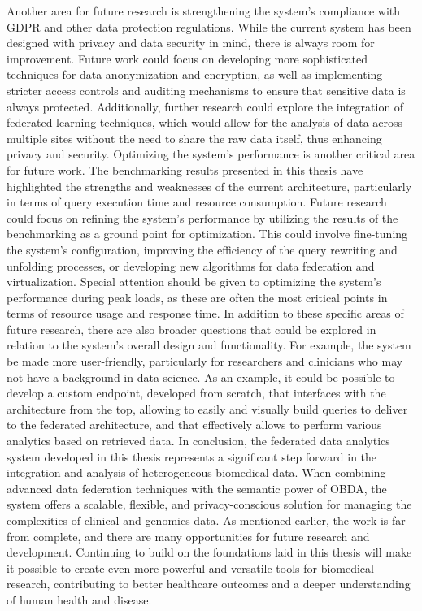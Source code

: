 Another area for future research is strengthening the system's compliance with \ac{GDPR} and other data protection regulations. While the current system has been designed with privacy and data security in mind, there is always room for improvement. Future work could focus on developing more sophisticated techniques for data anonymization and encryption, as well as implementing stricter access controls and auditing mechanisms to ensure that sensitive data is always protected. Additionally, further research could explore the integration of federated learning techniques, which would allow for the analysis of data across multiple sites without the need to share the raw data itself, thus enhancing privacy and security.
Optimizing the system's performance is another critical area for future work. The benchmarking results presented in this thesis have highlighted the strengths and weaknesses of the current architecture, particularly in terms of query execution time and resource consumption. Future research could focus on refining the system's performance by utilizing the results of the benchmarking as a ground point for optimization. This could involve fine-tuning the system's configuration, improving the efficiency of the query rewriting and unfolding processes, or developing new algorithms for data federation and virtualization. Special attention should be given to optimizing the system's performance during peak loads, as these are often the most critical points in terms of resource usage and response time.
In addition to these specific areas of future research, there are also broader questions that could be explored in relation to the system's overall design and functionality. For example, the system be made more user-friendly, particularly for researchers and clinicians who may not have a background in data science. As an example, it could be possible to develop a custom endpoint, developed from scratch, that interfaces with the architecture from the top, allowing to easily and visually build queries to deliver to the federated architecture, and that effectively allows to perform various analytics based on retrieved data.
In conclusion, the federated data analytics system developed in this thesis represents a significant step forward in the integration and analysis of heterogeneous biomedical data. When combining advanced data federation techniques with the semantic power of \ac{OBDA}, the system offers a scalable, flexible, and privacy-conscious solution for managing the complexities of clinical and genomics data. As mentioned earlier, the work is far from complete, and there are many opportunities for future research and development. Continuing to build on the foundations laid in this thesis will make it possible to create even more powerful and versatile tools for biomedical research, contributing to better healthcare outcomes and a deeper understanding of human health and disease.